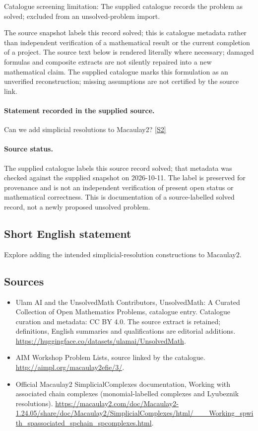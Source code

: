 \documentclass[11pt]{article}
\begin{document}
Catalogue screening limitation: The supplied catalogue records the problem as solved; excluded from an unsolved-problem import.

The source snapshot labels this record solved; this is catalogue metadata rather than independent verification of a mathematical result or the current completion of a project.
The source text below is rendered literally where necessary; damaged formulas and composite extracts are not silently repaired into a new mathematical claim.
The supplied catalogue marks this formulation as an unverified reconstruction; missing assumptions are not certified by the source link.
\paragraph{Statement recorded in the supplied source.}
Can we add simplicial resolutions to Macaulay2? \href{http://aimpl.org/macaulay2efie/3/}{[S2]}
\paragraph{Source status.}
The supplied catalogue labels this source record solved; that metadata was checked against the supplied snapshot on 2026-10-11. The label is preserved for provenance and is not an independent verification of present open status or mathematical correctness. This is documentation of a source-labelled solved record, not a newly proposed unsolved problem.
\subsection{Short English statement}
Explore adding the intended simplicial-resolution constructions to Macaulay2.
\subsection{Sources}
\begin{itemize}
\item[S1] Ulam AI and the UnsolvedMath Contributors, UnsolvedMath: A Curated Collection of Open Mathematics Problems, catalogue entry. Catalogue curation and metadata: CC BY 4.0. The source extract is retained; definitions, English summaries and qualifications are editorial additions.
\url{https://huggingface.co/datasets/ulamai/UnsolvedMath}.
\item[S2] AIM Workshop Problem Lists, source linked by the catalogue.
\url{http://aimpl.org/macaulay2efie/3/}.
\item[S3] Official Macaulay2 SimplicialComplexes documentation, Working with associated chain complexes (monomial-labelled complexes and Lyubeznik resolutions).
\url{https://macaulay2.com/doc/Macaulay2-1.24.05/share/doc/Macaulay2/SimplicialComplexes/html/___Working_spwith_spassociated_spchain_spcomplexes.html}.
\end{itemize}
\end{document}

